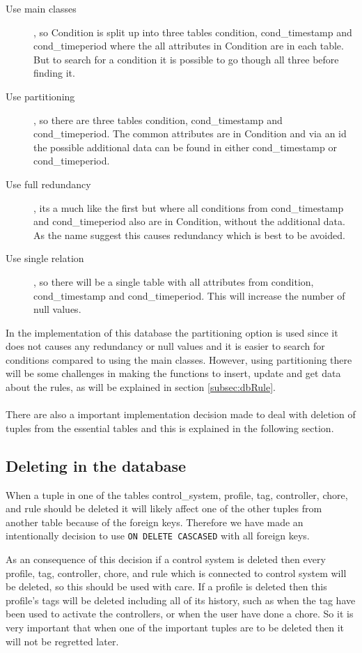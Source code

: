 \begin{description}
	\item[Use main classes], so Condition is split up into three tables condition, cond\_timestamp and cond\_timeperiod where the all attributes in Condition are in each table. But to search for a condition it is possible to go though all three before finding it. 
	\item[Use partitioning], so there are three tables condition, cond\_timestamp and cond\_timeperiod. The common attributes are in Condition and via an id the possible additional data can be found in either cond\_timestamp or cond\_timeperiod.
	\item[Use full redundancy], its a much like the first but where all conditions from cond\_timestamp and cond\_timeperiod also are in Condition, without the additional data. As the name suggest this causes redundancy which is best to be avoided.
	\item[Use single relation], so there will be a single table with all attributes from condition, cond\_timestamp and cond\_timeperiod. This will increase the number of null values. 
\end{description}

In the implementation of this database the partitioning option is used since it does not causes any redundancy or null values and it is easier to search for conditions compared to using the main classes. However, using partitioning there will be some challenges in making the functions to insert, update and get data about the rules, as will be explained in section \vref{subsec:dbRule}.\\\\


There are also a important implementation decision made to deal with deletion of tuples from the essential tables and this is explained in the following section.
 
\subsection{Deleting in the database}
When a tuple in one of the tables control\_system, profile, tag, controller, chore, and rule should be deleted it will likely affect one of the other tuples from another table because of the foreign keys. Therefore we have made an intentionally decision to use \texttt{ON DELETE CASCASED} with all foreign keys.

As an consequence of this decision if a control system is deleted then every profile, tag, controller, chore, and rule which is connected to control system will be deleted, so this should be used with care. 
If a profile is deleted then this profile's tags will be deleted including all of its history, such as when the tag have been used to activate the controllers, or when the user have done a chore. So it is very important that when one of the important tuples are to be deleted then it will not be regretted later. \\\\

